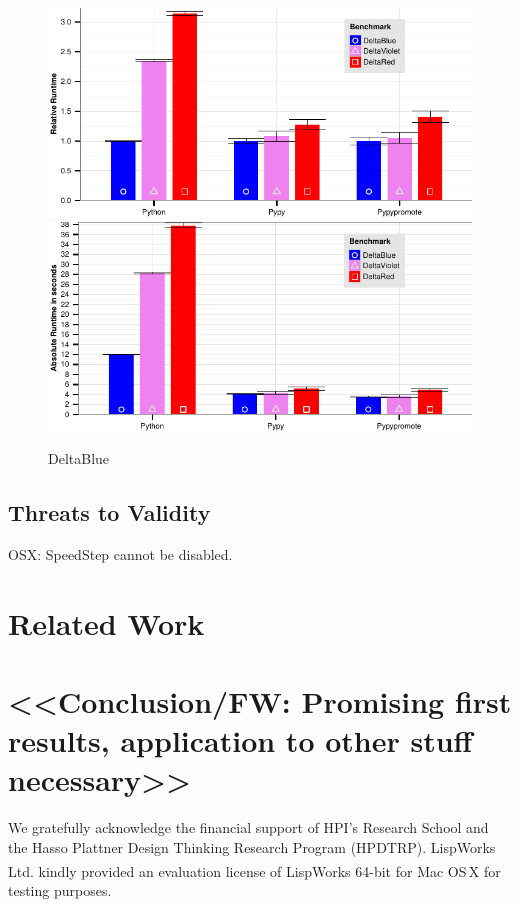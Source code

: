 \documentclass[preprint,english,10pt,nonatbib]{sigplanconf}
\begin{document}
\begin{figure}
  \centering
  \includegraphics[width=.48\linewidth]{bench/DeltaBlue-norm.pdf}
  \hfil
  \includegraphics[width=.48\linewidth]{bench/DeltaBlue.pdf}
  \caption{DeltaBlue}
\end{figure}

\subsection{Threats to Validity}

OSX: SpeedStep cannot be disabled.

\section{Related Work}

\section{<<Conclusion/FW: Promising first results, application to other stuff necessary>>}

\acks
We gratefully acknowledge the financial support of HPI's Research School and
the Hasso Plattner Design Thinking Research Program (HPDTRP).
LispWorks Ltd. kindly provided an evaluation license of
LispWorks\textsuperscript{\textregistered} 64-bit for Mac OS\,X for testing
purposes.

\printbibliography


\end{document}
